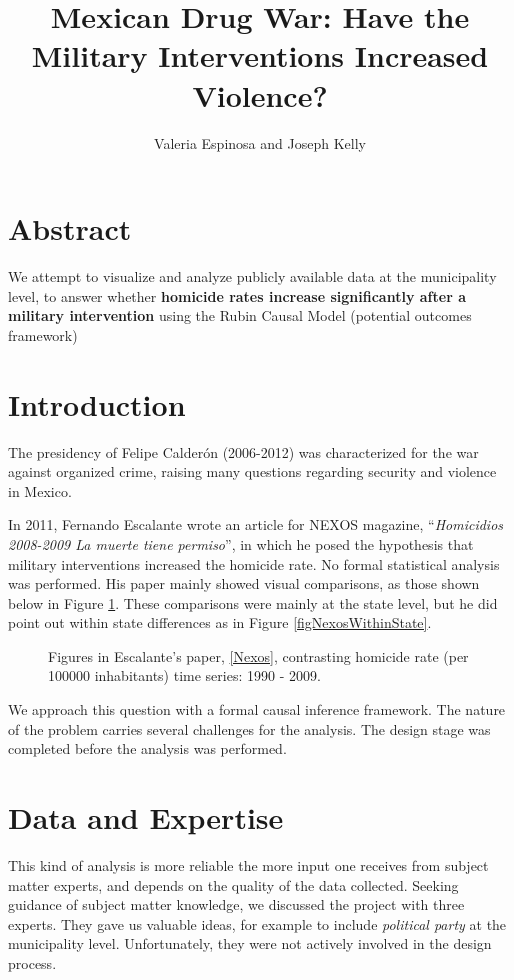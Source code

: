 \documentclass{article}[11 pt]
\begin{document}
	\title{Mexican Drug War: Have the Military Interventions Increased Violence?}
	\author{Valeria Espinosa and Joseph Kelly}
	
	\maketitle

\section{Abstract}
  We attempt to visualize and analyze publicly available data at the municipality level, to answer whether \textbf{homicide rates increase significantly after a military intervention} using the Rubin Causal Model (potential outcomes framework)
	
\section{Introduction}	
	The presidency of Felipe Calder\'{o}n (2006-2012) was characterized for the war against organized crime, raising many questions regarding security and violence in Mexico.
	
In 2011, Fernando Escalante wrote an article for NEXOS magazine, ``\emph{Homicidios 2008-2009 La muerte tiene permiso}'', in which he posed the hypothesis that military interventions increased the homicide rate. No formal statistical analysis was performed. His paper mainly showed visual comparisons, as those shown below in Figure \ref{figNexos}. These comparisons were mainly at the state level, but he did point out within state differences as in Figure \ref{figNexosWithinState}.
\begin{figure}[htdp]
    \centering
{}
\caption{Figures in Escalante's paper, \ref{Nexos}, contrasting homicide rate (per 100000 inhabitants) time series: 1990 - 2009.}	
			\label{figNexos}
\end{figure}
	We approach this question with a formal causal inference framework. The nature of the problem carries several challenges for the analysis. The design stage was completed before the analysis was performed.
	
\section{Data and Expertise}
This kind of analysis is more reliable the more input one receives from subject matter experts, and depends on the quality of the data collected. Seeking guidance of subject matter knowledge, we discussed the project with three experts. %
They gave us valuable ideas, for example to include \emph{political party} at the municipality level. Unfortunately, they were not actively involved in the design process.
\end{document}
